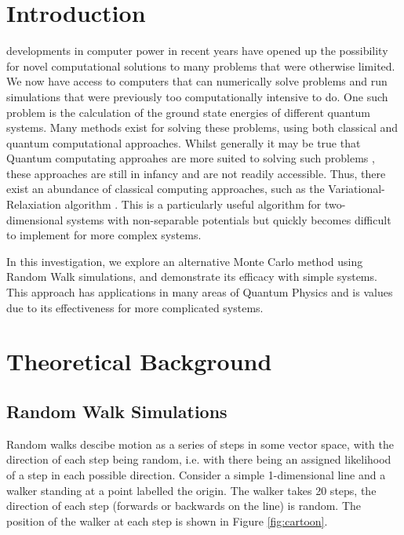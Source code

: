 \documentclass[journal]{IEEEtran}
\begin{document}
\section{Introduction}
 developments in computer power in recent years have opened
up the possibility for novel computational solutions to many problems that were
otherwise limited. We now have access to computers that can numerically solve
problems and run simulations that were previously too computationally intensive
to do.  One such problem is the calculation of the ground state energies of
different quantum systems. Many methods exist for solving these problems, using
both classical and quantum computational approaches. Whilst generally it may be
true that Quantum computating approahes are more suited to solving such problems
\cite{Mazzola}, these approaches are still in infancy and are not readily
accessible. Thus, there exist an abundance of classical computing approaches,
such as the Variational-Relaxiation algorithm \cite{Schroeder2017}. This is a
particularly useful algorithm for two-dimensional systems with non-separable
potentials but quickly becomes difficult to implement for more complex systems.

In this investigation, we explore an alternative Monte Carlo method using Random
Walk simulations, and demonstrate its efficacy with simple systems. This
approach has applications in many areas of Quantum Physics and is values due to
its effectiveness for more complicated systems.

\section{Theoretical Background}
\label{sec:TheoreticalBackground}

\subsection{Random Walk Simulations}

Random walks descibe motion as a series of steps in some vector space, with the
direction of each step being random, i.e. with there being an assigned likelihood
of a step in each possible direction. Consider a simple 1-dimensional line and a
walker standing at a point labelled the origin. The walker takes 20 steps, the
direction of each step (forwards or backwards on the line) is random. The
position of the walker at each step is shown in Figure \ref{fig:cartoon}.
\end{document}
